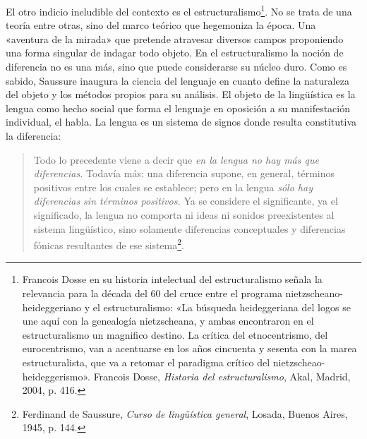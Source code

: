 El otro indicio ineludible del contexto es el estructuralismo\footnote{Francois Dosse en su historia intelectual del estructuralismo señala la relevancia para la década del 60 del cruce entre el programa nietzscheano-heideggeriano y el estructuralismo: «La búsqueda heideggeriana del logos se une aquí con la genealogía nietzscheana, y ambas encontraron en el estructuralismo un magnifico destino. La crítica del etnocentrismo, del eurocentrismo, van a acentuarse en los años cincuenta y sesenta con la marea estructuralista, que va a retomar el paradigma crítico del nietzscheao-heideggerismo». Francois Dosse, \emph{Historia del estructuralismo}, Akal, Madrid, 2004, p. 416.}. No se trata de una teoría entre otras, sino del marco teórico que hegemoniza la época. Una «aventura de la mirada» que pretende atravesar diversos campos proponiendo una forma singular de indagar todo objeto. En el estructuralismo la noción de diferencia no es una más, sino que puede considerarse su núcleo duro. Como es sabido, Saussure inaugura la ciencia del lenguaje en cuanto define la naturaleza del objeto y los métodos propios para su análisis. El objeto de la lingüística es la lengua como hecho social que forma el lenguaje en oposición a su manifestación individual, el habla. La lengua es un sistema de signos donde resulta constitutiva la diferencia:

\begin{quote}
Todo lo precedente viene a decir que \emph{en la lengua no hay más que diferencias.} Todavía más: una diferencia supone, en general, términos positivos entre los cuales se establece; pero en la lengua \emph{sólo hay diferencias sin términos positivos.} Ya se considere el significante, ya el significado, la lengua no comporta ni ideas ni sonidos preexistentes al sistema lingüístico, sino solamente diferencias conceptuales y diferencias fónicas resultantes de ese sistema\footnote{Ferdinand de Saussure, \emph{Curso de lingüística general}, Losada, Buenos Aires, 1945, p. 144.}.
\end{quote}

